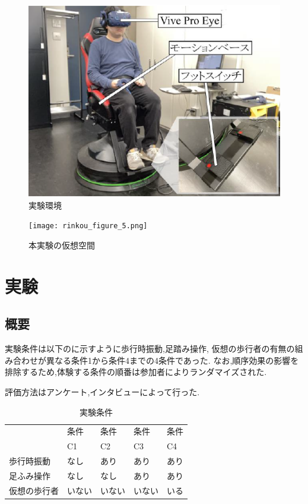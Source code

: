\documentclass[uplatex]{jsarticle}   %
\begin{document}
\begin{figure}[t]
    \centering
    \includegraphics{reinkou_figure_1.png}
    \caption{実験環境}
    \label{fig:my_label}
\end{figure}

\begin{figure}[t]
    \centering
    \texttt{[image: rinkou\_figure\_5.png]}
    \caption{本実験の仮想空間}
    \label{fig:my_label_2}
\end{figure}



\section{実験}
\subsection{概要}
実験条件は以下のに示すように歩行時振動,足踏み操作,
仮想の歩行者の有無の組み合わせが異なる条件1から条件4までの4条件であった.
なお,順序効果の影響を排除するため,体験する条件の順番は参加者によりランダマイズされた.


評価方法はアンケート,インタビューによって行った.
\begin{table}
  \centering
  \caption{実験条件}
  \label{tab:fonts}
  \begin{tabular}[t]{|l|l|l|l|l|}
    \hline
     & 条件 & 条件 & 条件 & 条件\\
     & C1 & C2 & C3 &C4\\
    \hline
    歩行時振動 &なし&あり&あり&あり\\
    \hline
    足ふみ操作&なし&なし&あり&あり\\ 
    \hline
    仮想の歩行者&いない&いない&いない &いる\\
    \hline
  \end{tabular}
\end{table}
\end{document}
